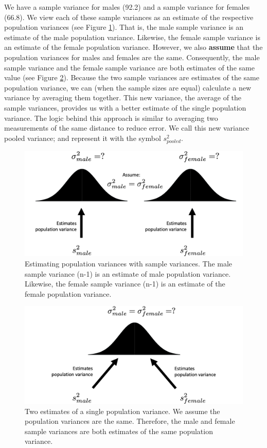 \documentclass[
]{krantz}
\begin{document}
We have a sample variance for males (92.2) and a sample variance for females (66.8). We view each of these sample variances as an estimate of the respective population variances (see Figure \ref{fig:pool1}). That is, the male sample variance is an estimate of the male population variance. Likewise, the female sample variance is an estimate of the female population variance. However, we also \textbf{assume} that the population variances for males and females are the same. Consequently, the male sample variance and the female sample variance are both estimates of the same value (see Figure \ref{fig:pool2}). Because the two sample variances are estimates of the same population variance, we can (when the sample sizes are equal) calculate a new variance by averaging them together. This new variance, the average of the sample variances, provides us with a better estimate of the single population variance. The logic behind this approach is similar to averaging two measurements of the same distance to reduce error. We call this new variance pooled variance; and represent it with the symbol \(s_{pooled}^2\).

\newpage

\begin{figure}
\includegraphics[width=0.8\linewidth]{ch_samples/images/pool1} \caption[Estimating population variances with sample variances]{Estimating population variances with sample variances. The male sample variance (n-1) is an estimate of male population variance. Likewise, the female sample variance (n-1) is an estimate of the female population variance. }\label{fig:pool1}
\end{figure}

\vspace{25mm}

\begin{figure}
\includegraphics[width=0.8\linewidth]{ch_samples/images/pool2} \caption[Two estimates of a single population variance]{Two estimates of a single population variance. We assume the population variances are the same. Therefore, the male and female sample variances are both estimates of the same population variance.}\label{fig:pool2}
\end{figure}
\end{document}
